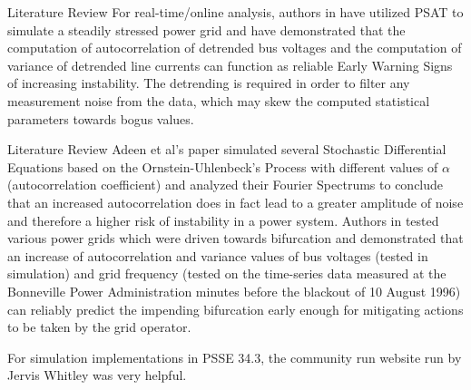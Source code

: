 \begin{frame}{Literature Review}
	For real-time/online analysis, authors in \cite{ghanvati01} have utilized PSAT \cite{psatMilano} to simulate a steadily stressed power grid and have demonstrated that the computation of autocorrelation of detrended bus voltages and the computation  of variance of detrended line currents can function as reliable Early Warning Signs of increasing instability. The detrending is required in order to filter any measurement noise from the data, which may skew the computed statistical parameters towards bogus values. 
\end{frame}

\begin{frame}{Literature Review}
	Adeen et al's paper \cite{adeen01} simulated several Stochastic Differential Equations based on the Ornstein-Uhlenbeck's Process with different values of $\alpha$ (autocorrelation coefficient) and analyzed their Fourier Spectrums to conclude that an increased autocorrelation does in fact lead to a greater amplitude of noise and therefore a higher risk of instability in a power system. Authors in \cite{sanchez01} tested various power grids which were driven towards bifurcation and demonstrated that an increase of autocorrelation and variance values of bus voltages (tested in simulation) and grid frequency (tested on the time-series data measured at the Bonneville Power Administration minutes before the blackout of 10 August 1996) can reliably predict the impending bifurcation early enough for mitigating actions to be taken by the grid operator.
	
	For simulation implementations in PSSE 34.3, the community run website run by Jervis Whitley \cite{psspyWebsite} was very helpful.
\end{frame}
